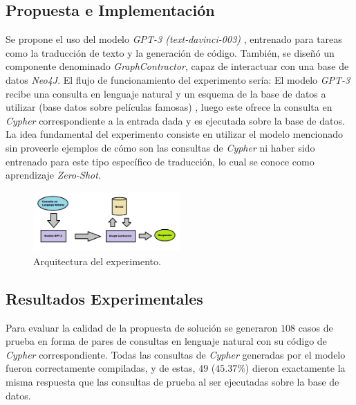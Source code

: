 \documentclass[a4paper,10pt,twocolumn]{article}
\begin{document}
\subsection{Propuesta e Implementación}
Se propone el uso del modelo \textit{GPT-3 (text-davinci-003)} \cite{gpt3}, entrenado para tareas como la traducción de texto y la generación de código. También, se diseñó un componente denominado \textit{GraphContractor}, capaz de interactuar con una base de datos \textit{Neo4J}. El flujo de funcionamiento del experimento sería: El modelo \textit{GPT-3} recibe una consulta en lenguaje natural y un esquema \cite{dbschema} de la base de datos a utilizar (base datos sobre películas famosas) \cite{moviesdb}, luego este ofrece la consulta en \textit{Cypher} correspondiente a la entrada dada y es ejecutada sobre la base de datos. La idea fundamental del experimento consiste en utilizar el modelo mencionado sin proveerle ejemplos de cómo son las consultas de \textit{Cypher} ni haber sido entrenado para este tipo específico de traducción, lo cual se conoce como aprendizaje \textit{Zero-Shot}.

\begin{figure}[h!]
\includegraphics[width=0.5\textwidth]{img/architecture.png}
\caption{Arquitectura del experimento.}\label{img:arch}
\end{figure}

\subsection{Resultados Experimentales}
Para evaluar la calidad de la propuesta de solución se generaron $108$ casos de prueba en forma de pares de consultas en lenguaje natural con su código de \textit{Cypher} correspondiente. Todas las consultas de \textit{Cypher} generadas por el modelo fueron correctamente compiladas, y  de estas, $49$ ($45.37\%$) dieron exactamente la misma respuesta que las consultas de prueba al ser ejecutadas sobre la base de datos.
\end{document}
